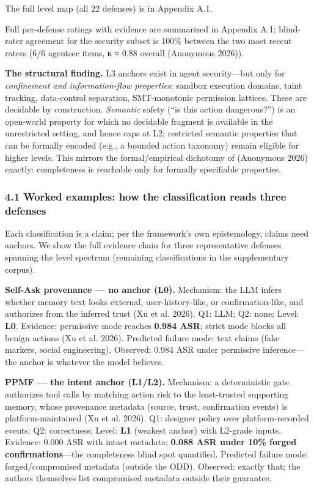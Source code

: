 \documentclass[

]{article}
\newcounter{none} %
\begin{document}
The full level map (all 22 defenses) is in Appendix A.1.



Full per-defense ratings with evidence are summarized in Appendix A.1; blind-rater agreement for the security subset is 100\% between the two most recent raters (6/6 agentsec items, κ ≈ 0.88 overall (Anonymous 2026)).



\textbf{The structural finding.} L3 anchors exist in agent security---but only for \emph{confinement and information-flow properties}: sandbox execution domains, taint tracking, data-control separation, SMT-monotonic permission lattices. These are decidable by construction. \emph{Semantic} safety (``is this action dangerous?'') is an open-world property for which no decidable fragment is available in the unrestricted setting, and hence caps at L2; restricted semantic properties that can be formally encoded (e.g., a bounded action taxonomy) remain eligible for higher levels. This mirrors the formal/empirical dichotomy of (Anonymous 2026) exactly: completeness is reachable only for formally specifiable properties.



\subsubsection{4.1 Worked examples: how the classification reads three defenses}\label{worked-examples-how-the-classification-reads-three-defenses}



Each classification is a claim; per the framework's own epistemology, claims need anchors. We show the full evidence chain for three representative defenses spanning the level spectrum (remaining classifications in the supplementary corpus).



\textbf{Self-Ask provenance --- no anchor (L0).} Mechanism: the LLM infers whether memory text looks external, user-history-like, or confirmation-like, and authorizes from the inferred trust (Xu et al. 2026). Q1: LLM; Q2: none; Level: \textbf{L0}. Evidence: permissive mode reaches \textbf{0.984 ASR}; strict mode blocks all benign actions (Xu et al. 2026). Predicted failure mode: text claims (fake markers, social engineering). Observed: 0.984 ASR under permissive inference---the anchor is whatever the model believes.



\textbf{PPMF --- the intent anchor (L1/L2).} Mechanism: a deterministic gate authorizes tool calls by matching action risk to the least-trusted supporting memory, whose provenance metadata (source, trust, confirmation events) is platform-maintained (Xu et al. 2026). Q1: designer policy over platform-recorded events; Q2: correctness; Level: \textbf{L1} (weakest anchor) with L2-grade inputs. Evidence: 0.000 ASR with intact metadata; \textbf{0.088 ASR under 10\% forged confirmations}---the completeness blind spot quantified. Predicted failure mode: forged/compromised metadata (outside the ODD). Observed: exactly that; the authors themselves list compromised metadata outside their guarantee.
\end{document}
